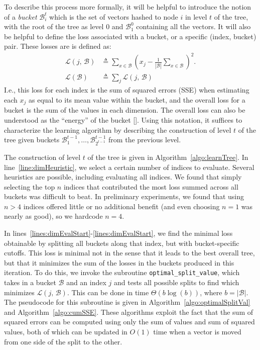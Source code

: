 To describe this process more formally, it will be helpful to introduce the notion of a \textit{bucket} $\mathcal{B}^t_i$ which is the set of vectors hashed to node $i$ in level $t$ of the tree, with the root of the tree as level 0 and $\mathcal{B}^0_1$ containing all the vectors. It will also be helpful to define the loss associated with a bucket, or a specific (index, bucket) pair. These losses are is defined as:
\begin{align}
    \mathcal{L}(j \text{, } \mathcal{B}) &\triangleq \sum_{x \in \mathcal{B}} \left( x_j - \frac{1}{|\mathcal{B}|}\sum_{x \in \mathcal{B}} \right)^2.  \\
    \mathcal{L}(\mathcal{B}) &\triangleq \sum_j \mathcal{L}(j \text{, } \mathcal{B})
\end{align}
I.e., this loss for each index is the sum of squared errors (SSE) when estimating each $x_j$ as equal to its mean value within the bucket, and the overall loss for a bucket is the sum of the values in each dimension. The overall loss can also be understood as the ``energy'' of the bucket [].
Using this notation, it suffices to characterize the learning algorithm by describing the construction of level $t$ of the tree given buckets $\mathcal{B}^{t-1}_1,\ldots,\mathcal{B}^{t-1}_{2^{t-1}}$ from the previous level.

The construction of level $t$ of the tree is given in Algorithm~\ref{algo:learnTree}.
In line~\ref{line:dimHeuristic}, we select a certain number of indices to evaluate. Several heuristics are possible, including evaluating all indices. We found that simply selecting the top $n$ indices that contributed the most loss summed across all buckets was difficult to beat. In preliminary experiments, we found that using $n > 4$ indices offered little or no additional benefit (and even choosing $n = 1$ was nearly as good), so we hardcode $n = 4$.

In lines~\ref{lines:dimEvalStart}-\ref{lines:dimEvalStart}, we find the minimal loss obtainable by splitting all buckets along that index, but with bucket-specific cutoffs. This loss is minimal not in the sense that it leads to the best overall tree, but that it minimizes the sum of the losses in the buckets produced in this iteration. To do this, we invoke the subroutine \texttt{optimal\_split\_value}, which takes in a bucket $\mathcal{B}$ and an index $j$ and tests all possible splits to find which minimizes $\mathcal{L}(j \text{, } \mathcal{B})$. This can be done in time $\Theta(b \log(b))$, where $b = |\mathcal{B}|$. The pseudocode for this subroutine is given in Algorithm~\ref{algo:optimalSplitVal} and Algorithm~\ref{algo:cumSSE}. These algorithms exploit the fact that the sum of squared errors can be computed using only the sum of values and sum of squared values, both of which can be updated in $O(1)$ time when a vector is moved from one side of the split to the other.

